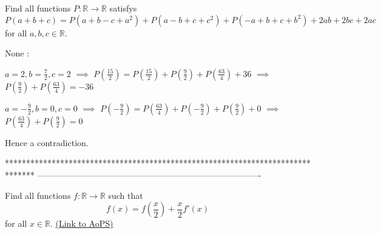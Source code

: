 \begin{solution}
	\begin{tcolorbox}Find all functions $ P: \mathbb{R} \to \mathbb{R}$ satisfys
\[ P(a + b + c) = P(a + b - c + a^2) + P(a - b + c + c^2) + P( - a + b + c + b^2) + 2ab + 2bc + 2ac
\]
for all $ a,b,c \in \mathbb{R}$.\end{tcolorbox}

None :

$ a=2, b=\frac{7}{2}, c=2$ $ \implies$ $ P(\frac{15}{2})=P(\frac{15}{2})+P(\frac{9}{2})+P(\frac{63}{4})+36$ $ \implies$ $ P(\frac{9}{2})+P(\frac{63}{4})=-36$

$ a=-\frac{9}{2}, b=0, c=0$ $ \implies$ $ P(-\frac{9}{2})=P(\frac{63}{4})+P(-\frac{9}{2})+P(\frac{9}{2})+0$ $ \implies$ $ P(\frac{63}{4})+P(\frac{9}{2})=0$

Hence a contradiction.
\end{solution}
*******************************************************************************
-------------------------------------------------------------------------------

\begin{problem}
	Find all functions $f: \mathbb R \to \mathbb R$ such that
 \[ f(x)=f\left(\frac{x}{2}\right)+\frac{x}{2}f'(x)\]
for all $x \in \mathbb R$.
	\flushright \href{https://artofproblemsolving.com/community/c6h278400}{(Link to AoPS)}
\end{problem}



